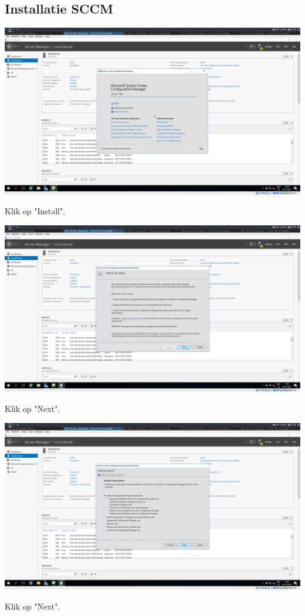 \documentclass[a4paper]{article}
\begin{document}
\subsection{Installatie SCCM}
\begin{center}
\includegraphics[width=15cm]{Pictures/SCCM/6/1543502369.png}

Klik op "Install".
\end{center}
\begin{center}
\includegraphics[width=15cm]{Pictures/SCCM/6/1543502380.png}

Klik op "Next".
\end{center}
\begin{center}
\includegraphics[width=15cm]{Pictures/SCCM/6/1543502389.png}

Klik op "Next".
\end{center}
\end{document}
